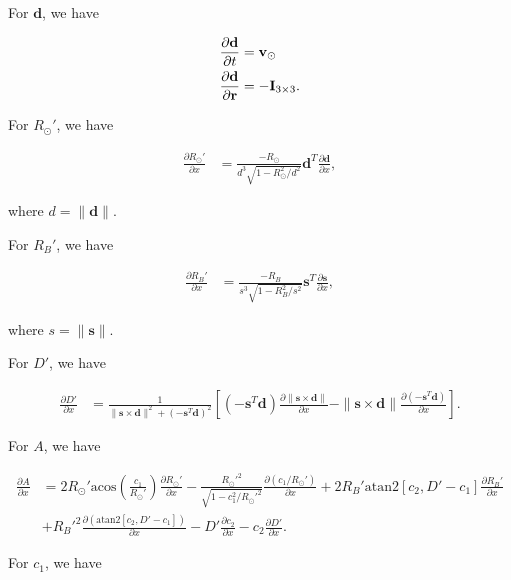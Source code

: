 For $\mathbf{d}$, we have

\begin{align}
\frac{\partial \mathbf{d}}{\partial t} &= \mathbf{v}_{\odot} \\
\frac{\partial \mathbf{d}}{\partial \mathbf{r}} &= - \mathbf{I}_{3 \times 3}.
\end{align}

For $R_{\odot}'$, we have

\begin{align}
\frac{\partial R_{\odot}'}{\partial x} &= \frac{- R_{\odot}}{d^3 \sqrt{1 - R_{\odot}^2/d^2}} \mathbf{d}^T \frac{\partial \bm{d}}{\partial x},
\end{align}

\noindent where $d = \| \mathbf{d} \|$.

For $R_B'$, we have

\begin{align}
\frac{\partial R_B'}{\partial x} &= \frac{-R_B}{s^3 \sqrt{1 - R_B^2 / s^2}} \mathbf{s}^T \frac{\partial \mathbf{s}}{\partial x},
\end{align}

\noindent where $s = \| \mathbf{s} \|$.

For $D'$, we have

\begin{align}
\frac{\partial D'}{\partial x} &= \frac{1}{\| \mathbf{s} \times \mathbf{d} \|^2 + (-\mathbf{s}^T \mathbf{d})^2} \left[ \left( - \mathbf{s}^T \mathbf{d} \right) \frac{\partial \| \mathbf{s} \times \mathbf{d} \|}{\partial x} - \| \mathbf{s} \times \mathbf{d} \| \frac{\partial \left(-\mathbf{s}^T \mathbf{d} \right)}{\partial x} \right].
\end{align}

For $A$, we have

\begin{align}
\frac{\partial A}{\partial x} &= 2 R_{\odot}' \mathrm{acos} \left( \frac{c_1}{R_{\odot}'} \right) \frac{\partial R_{\odot}'}{\partial x} - \frac{R_{\odot}'^2}{\sqrt{1 - c_1^2 / R_{\odot}'^2}} \frac{\partial \left( c_1 / R_{\odot}' \right)}{\partial x} + 2 R_B' \mathrm{atan2} \left[ c_2, D' - c_1 \right] \frac{\partial R_B'}{\partial x} \\
&+ R_B'^2 \frac{\partial \left( \mathrm{atan2} \left[ c_2, D' - c_1 \right] \right)}{\partial x} - D' \frac{\partial c_2}{\partial x} - c_2 \frac{\partial D'}{\partial x}. \nonumber
\end{align}

For $c_1$, we have

